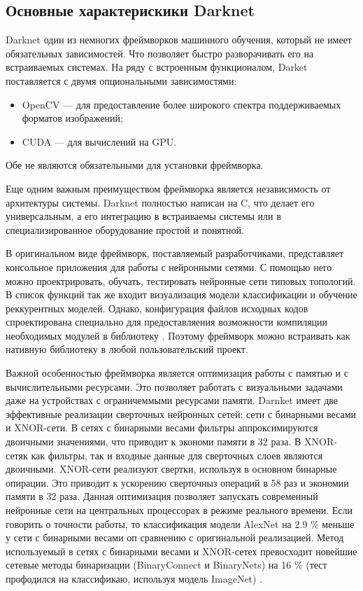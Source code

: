 \documentclass[a4paper,english,russian]{G2-105}
\begin{document}
\subsection{Основные характерискики Darknet}
\par Darknet один из немногих фреймворков машинного обучения, который не имеет обязательных зависимостей. Что позволяет быстро разворачивать его на встраиваемых системах. На ряду с встроенным функционалом, Darket поставляется с двумя опциональными зависимостями:
\begin{itemize}
\item OpenCV --- для предоставление более широкого спектра поддерживаемых форматов изображений;
\item CUDA --- для вычислений на GPU. 
\end{itemize}
\par Обе не являются обязательными для установки фреймворка.
\par Еще одним важным преимуществом фреймворка является независимость от архитектуры системы. Darknet полностью написан на C, что делает его универсальным, а его интеграцию в встраиваемы системы или в специализированное оборудование простой и понятной. 
\par В оригинальном виде фреймворк, поставляемый разработчиками, представляет консольное приложения для работы с нейронными сетями. С помощью него можно проектрировать, обучать, тестировать нейронные сети типовых топологий. В список функций так же входит визуализация модели классификации и обучение реккурентных моделей. Однако, конфигурация файлов исходных кодов спроектирована специально для предоставляения возможности компиляции необходимых модулей в библиотеку \cite{9}. Поэтому фреймворк можно встраивать как нативную библиотеку в любой пользовательский проект.
\par Важной особенностью фреймворка является оптимизация работы с памятью и с вычислительными ресурсами. Это позволяет работать с визуальными задачами даже на устройствах с ограничеммыми ресурсами памяти. Darnket имеет две эффективные реализации сверточных нейронных сетей: сети с бинарными весами и XNOR-сети. В сетях с бинарными весами фильтры аппроксимируются двоичными значениями, что приводит к экономи памяти в 32 раза. В XNOR-сетяк как фильтры, так и входные данные для сверточных слоев являются двоичными. XNOR-сети реализуют свертки, используя в основном бинарные опирации. Это приводит к ускорению сверточныз операций в 58 раз и экономии памяти в 32 раза. Данная оптимизация позволяет запускать современный нейронные сети на центральных процессорах в режиме реального времени. Если говорить о точности работы, то классификация модели AlexNet на 2.9 \% меньше у сети с бинарными весами оп сравнению с оригинальной реализацией. Метод используемый в сетях с бинарными весами и XNOR-сетех превосходит новейшие сетевые методы бинаризации (BinaryConnect и BinaryNets) на 16 \% (тест профодился на классификаю, используя модель ImageNet) \cite{10}.
\ttl
\end{document}
